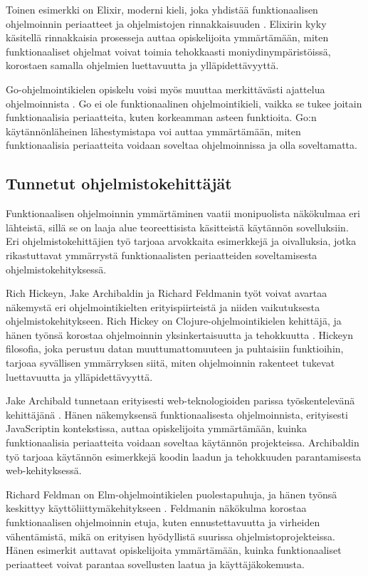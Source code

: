 Toinen esimerkki on Elixir, moderni kieli, joka yhdistää funktionaalisen ohjelmoinnin periaatteet ja ohjelmistojen rinnakkaisuuden \cite{elixir}. Elixirin kyky käsitellä rinnakkaisia prosesseja auttaa opiskelijoita ymmärtämään, miten funktionaaliset ohjelmat voivat toimia tehokkaasti moniydinympäristöissä, korostaen samalla ohjelmien luettavuutta ja ylläpidettävyyttä.

Go-ohjelmointikielen opiskelu voisi myös muuttaa merkittävästi ajattelua ohjelmoinnista \cite{golang}. Go ei ole funktionaalinen ohjelmointikieli, vaikka se tukee joitain funktionaalisia periaatteita, kuten korkeamman asteen funktioita. Go:n käytännönläheinen lähestymistapa voi auttaa ymmärtämään, miten funktionaalisia periaatteita voidaan soveltaa ohjelmoinnissa ja olla soveltamatta.

\subsection{Tunnetut ohjelmistokehittäjät}

Funktionaalisen ohjelmoinnin ymmärtäminen vaatii monipuolista näkökulmaa eri lähteistä, sillä se on laaja alue teoreettisista käsitteistä käytännön sovelluksiin. Eri ohjelmistokehittäjien työ tarjoaa arvokkaita esimerkkejä ja oivalluksia, jotka rikastuttavat ymmärrystä funktionaalisten periaatteiden soveltamisesta ohjelmistokehityksessä.

Rich Hickeyn, Jake Archibaldin ja Richard Feldmanin työt voivat avartaa näkemystä eri ohjelmointikielten erityispiirteistä ja niiden vaikutuksesta ohjelmistokehitykseen. Rich Hickey on Clojure-ohjelmointikielen kehittäjä, ja hänen työnsä korostaa ohjelmoinnin yksinkertaisuutta ja tehokkuutta \cite{hickey_maybe_not,hickey_persistent_2009}. Hickeyn filosofia, joka perustuu datan muuttumattomuuteen ja puhtaisiin funktioihin, tarjoaa syvällisen ymmärryksen siitä, miten ohjelmoinnin rakenteet tukevat luettavuutta ja ylläpidettävyyttä.

Jake Archibald tunnetaan erityisesti web-teknologioiden parissa työskentelevänä kehittäjänä \cite{against_self_closing_tags,is_reduce_bad}. Hänen näkemyksensä funktionaalisesta ohjelmoinnista, erityisesti JavaScriptin kontekstissa, auttaa opiskelijoita ymmärtämään, kuinka funktionaalisia periaatteita voidaan soveltaa käytännön projekteissa. Archibaldin työ tarjoaa käytännön esimerkkejä koodin laadun ja tehokkuuden parantamisesta web-kehityksessä.

Richard Feldman on Elm-ohjelmointikielen puolestapuhuja, ja hänen työnsä keskittyy käyttöliittymäkehitykseen \cite{feldman_fp_pragmatists,impossiblebetter}. Feldmanin näkökulma korostaa funktionaalisen ohjelmoinnin etuja, kuten ennustettavuutta ja virheiden vähentämistä, mikä on erityisen hyödyllistä suurissa ohjelmistoprojekteissa. Hänen esimerkit auttavat opiskelijoita ymmärtämään, kuinka funktionaaliset periaatteet voivat parantaa sovellusten laatua ja käyttäjäkokemusta.

